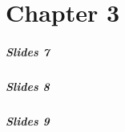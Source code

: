 \part{Chapter 3}

\begin{frame}
	\partpage
\end{frame}

\begin{frame}
	\frametitle{Slides 7}
\end{frame}

\begin{frame}
	\frametitle{Slides 8}
\end{frame}

\begin{frame}
	\frametitle{Slides 9}
\end{frame}
